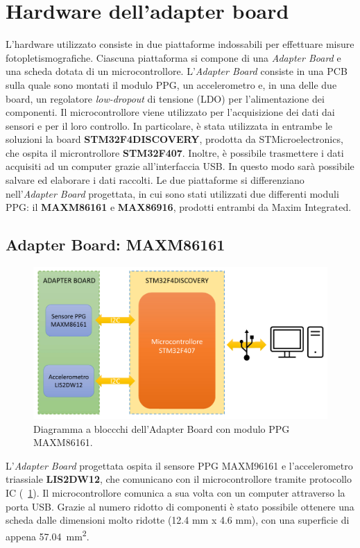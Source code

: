 \section{Hardware dell'adapter board}\label{cap:Hardware}
L'hardware utilizzato consiste in due piattaforme indossabili per effettuare misure fotopletismografiche. Ciascuna piattaforma si compone di una \textit{Adapter Board} e una scheda dotata di un microcontrollore. L'\textit{Adapter Board} consiste in una PCB sulla quale sono montati il modulo PPG, un accelerometro e, in una delle due board, un regolatore \textit{low-dropout} di tensione (LDO) per l'alimentazione dei componenti. Il microcontrollore viene utilizzato per l'acquisizione dei dati dai sensori e per il loro controllo. In particolare, è stata utilizzata in entrambe le soluzioni la board \textbf{STM32F4DISCOVERY}, prodotta da STMicroelectronics, che ospita il microntrollore \textbf{STM32F407}. Inoltre, è possibile trasmettere i dati acquisiti ad un computer grazie all'interfaccia USB. In questo modo sarà possibile salvare ed elaborare i dati raccolti.
Le due piattaforme si differenziano nell'\textit{Adapter Board} progettata, in cui sono stati utilizzati due differenti moduli PPG: il \textbf{MAXM86161} e \textbf{MAX86916}, prodotti entrambi da Maxim Integrated.
\subsection{Adapter Board: MAXM86161}
\begin{figure}[t]
	\centering
	\includegraphics[width=0.6\linewidth]{ImageFiles/Hardware/DiagrammaBlocchiMAXM86161}
	\caption{Diagramma a bloccchi dell'Adapter Board con modulo PPG MAXM86161.}
	\label{fig:DiagrammaBlocchiMAXM86161}
\end{figure}
L'\textit{Adapter Board} progettata ospita il sensore PPG MAXM96161 e l'accelerometro triassiale \textbf{LIS2DW12}, che comunicano con il microcontrollore tramite protocollo IC (\Fig~\ref{fig:DiagrammaBlocchiMAXM86161}). Il microcontrollore comunica a sua volta con un computer attraverso la porta USB. Grazie al numero ridotto di componenti è stato possibile ottenere una scheda dalle dimensioni molto ridotte (12.4 mm x 4.6 mm), con una superficie di appena \SI{57.04}{\square\milli\meter}.

